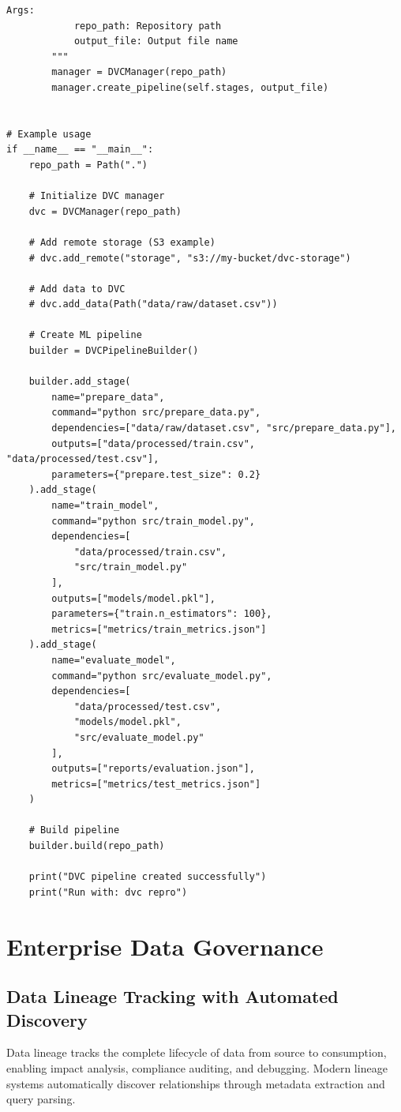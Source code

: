 \begin{lstlisting}[style=python, caption={DVC integration and pipeline automation}]
        Args:
            repo_path: Repository path
            output_file: Output file name
        """
        manager = DVCManager(repo_path)
        manager.create_pipeline(self.stages, output_file)


# Example usage
if __name__ == "__main__":
    repo_path = Path(".")

    # Initialize DVC manager
    dvc = DVCManager(repo_path)

    # Add remote storage (S3 example)
    # dvc.add_remote("storage", "s3://my-bucket/dvc-storage")

    # Add data to DVC
    # dvc.add_data(Path("data/raw/dataset.csv"))

    # Create ML pipeline
    builder = DVCPipelineBuilder()

    builder.add_stage(
        name="prepare_data",
        command="python src/prepare_data.py",
        dependencies=["data/raw/dataset.csv", "src/prepare_data.py"],
        outputs=["data/processed/train.csv", "data/processed/test.csv"],
        parameters={"prepare.test_size": 0.2}
    ).add_stage(
        name="train_model",
        command="python src/train_model.py",
        dependencies=[
            "data/processed/train.csv",
            "src/train_model.py"
        ],
        outputs=["models/model.pkl"],
        parameters={"train.n_estimators": 100},
        metrics=["metrics/train_metrics.json"]
    ).add_stage(
        name="evaluate_model",
        command="python src/evaluate_model.py",
        dependencies=[
            "data/processed/test.csv",
            "models/model.pkl",
            "src/evaluate_model.py"
        ],
        outputs=["reports/evaluation.json"],
        metrics=["metrics/test_metrics.json"]
    )

    # Build pipeline
    builder.build(repo_path)

    print("DVC pipeline created successfully")
    print("Run with: dvc repro")
\end{lstlisting}

\section{Enterprise Data Governance}

\subsection{Data Lineage Tracking with Automated Discovery}

Data lineage tracks the complete lifecycle of data from source to consumption, enabling impact analysis, compliance auditing, and debugging. Modern lineage systems automatically discover relationships through metadata extraction and query parsing.

